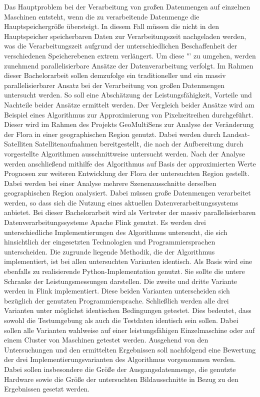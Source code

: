 \newline
Das Hauptproblem bei der Verarbeitung von großen Datenmengen auf einzelnen Maschinen entsteht, wenn die zu verarbeitende Datenmenge die Hauptspeichergröße übersteigt. In diesem Fall müssen die nicht in den Hauptspeicher speicherbaren Daten zur Verarbeitungszeit nachgeladen werden, was die Verarbeitungszeit aufgrund der unterschiedlichen Beschaffenheit der verschiedenen Speicherebenen extrem verlängert. Um diese "' zu umgehen, werden zunehmend parallelisierbare Ansätze der Datenverarbeitung verfolgt.
Im Rahmen dieser Bachelorarbeit sollen demzufolge ein traditioneller und ein massiv parallelisierbarer Ansatz bei der Verarbeitung von großen Datenmengen untersucht werden. So soll eine Abschätzung der Leistungsfähigkeit, Vorteile und Nachteile beider Ansätze ermittelt werden. Der Vergleich beider Ansätze wird am Beispiel eines Algorithmus zur Approximierung von Pixelzeitreihen durchgeführt. Dieser wird im Rahmen des Projekts GeoMultiSens\cite{GeoMultiSensWebsite} zur Analyse der Veränderung der Flora in einer geographischen Region genutzt. Dabei werden durch Landsat-Satelliten Satellitenaufnahmen bereitgestellt, die nach der Aufbereitung durch vorgestellte Algorithmen ausschnittweise untersucht werden. Nach der Analyse werden anschließend mithilfe des Algorithmus auf Basis der approximierten Werte Prognosen zur weiteren Entwicklung der Flora der untersuchten Region gestellt. Dabei werden bei einer Analyse mehrere Szenenausschnitte derselben geographischen Region analysiert. Dabei müssen große Datenmengen verarbeitet werden, so dass sich die Nutzung eines aktuellen Datenverarbeitungssystems anbietet. Bei dieser Bachelorarbeit wird als Vertreter der massiv parallelisierbaren Datenverarbeitungssysteme Apache Flink genutzt.
\newline
Es werden drei unterschiedliche Implementierungen des Algorithmus untersucht, die sich hinsichtlich der eingesetzten Technologien und Programmiersprachen unterscheiden. Die zugrunde liegende Methodik, die der Algorithmus implementiert, ist bei allen untersuchten Varianten identisch. Als Basis wird eine ebenfalls zu realisierende Python-Implementation genutzt. Sie sollte die untere Schranke der Leistungsmessungen darstellen. Die zweite und dritte Variante werden in Flink implementiert. Diese beiden Varianten unterscheiden sich bezüglich der genutzten Programmiersprache. Schließlich werden alle drei Varianten unter möglichst identischen Bedingungen getestet. Dies bedeutet, dass sowohl die Testumgebung als auch die Testdaten identisch sein sollen. Dabei sollen alle Varianten wahlweise auf einer leistungsfähigen Einzelmaschine oder auf einem Cluster von Maschinen getestet werden. Ausgehend von den Untersuchungen und den ermittelten Ergebnissen soll nachfolgend eine Bewertung der drei Implementierungsvarianten des Algorithmus vorgenommen werden. Dabei sollen insbesondere die Größe der Ausgangsdatenmenge, die genutzte Hardware sowie die Größe der untersuchten Bildausschnitte in Bezug zu den Ergebnissen gesetzt werden.

